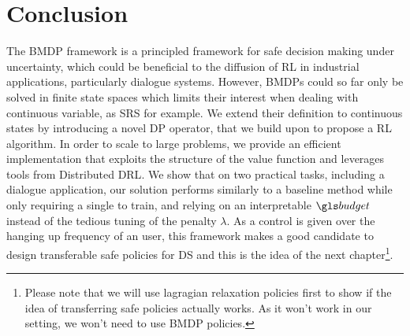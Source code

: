 \section{Conclusion}
\label{sec:conclusion}
The \gls{BMDP} framework is a principled framework for safe decision making under uncertainty, which could be beneficial to the diffusion of \gls{RL} in industrial applications, particularly dialogue systems. However, \glspl{BMDP} could so far only be solved in finite state spaces which limits their interest when dealing with continuous variable, as \gls{SRS} for example. We extend their definition to continuous states by introducing a novel \gls{DP} operator, that we build upon to propose a \gls{RL} algorithm. In order to scale to large problems, we provide an efficient implementation that exploits the structure of the value function and leverages tools from Distributed \gls{DRL}. We show that on two practical tasks, including a dialogue application, our solution performs similarly to a baseline  method while only requiring a single  to train, and relying on an interpretable $\budget$ instead of the tedious tuning of the penalty $\lambda$. As a control is given over the hanging up frequency of an user, this framework makes a good candidate to design transferable safe policies for \gls{DS} and this is the idea of the next chapter\footnote{Please note that we will use lagragian relaxation policies first to show if the idea of transferring safe policies actually works. As it won't work in our setting, we won't need to use BMDP policies.}.






